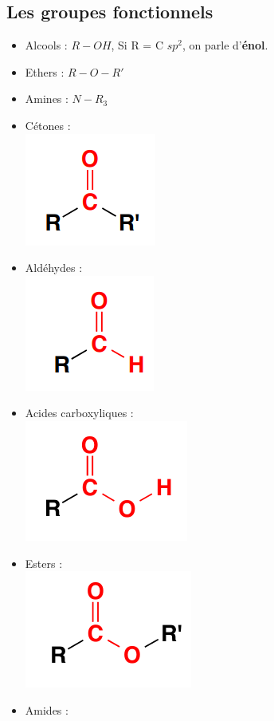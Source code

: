 \documentclass{article}
\begin{document}
    \pagebreak
    \subsection{Les groupes fonctionnels}
        \begin{itemize}
            \item Alcools : $R-OH$, Si R = C $sp^2$, on parle d'\textbf{énol}.
            \item Ethers : $R-O-R'$
            \item Amines : $N-R_3$
            \item Cétones : \\ \includegraphics[scale=.5]{cetone.png}
            \item Aldéhydes : \\\includegraphics[scale=.5]{aldehyde.png}
            \item Acides carboxyliques : \\\includegraphics[scale=.5]{acide_carboxylique.png}
            \item Esters : \\\includegraphics[scale=.5]{ester.png}
            \item Amides : \\
        \end{itemize}
\pagebreak
\end{document}
